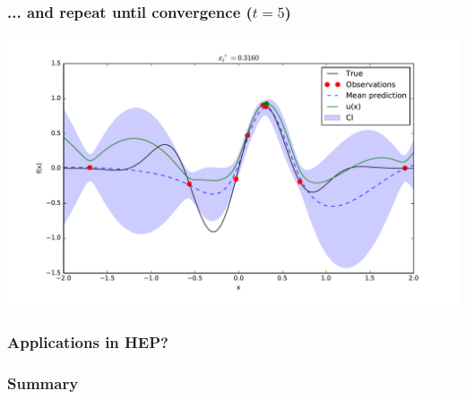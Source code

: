 \documentclass{beamer}
\begin{document}
\begin{frame}
    \frametitle{... and repeat until convergence ($t=5$)}
    \begin{center}
        \includegraphics[width=\textwidth]{code/fig4-5.pdf}
    \end{center}
\end{frame}

\begin{frame}
    \frametitle{Applications in HEP?}
\end{frame}

\begin{frame}
    \frametitle{Summary}
\end{frame}
\end{document}
